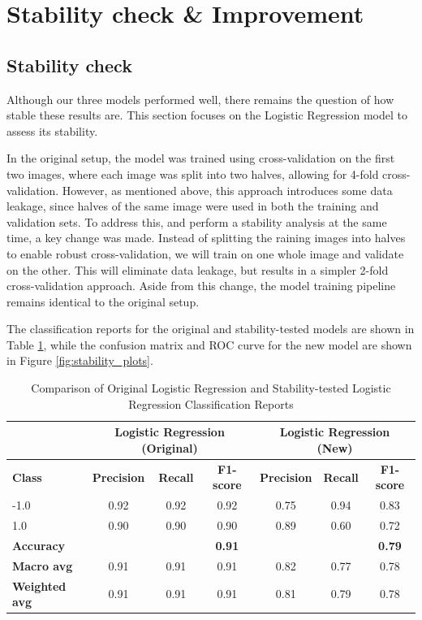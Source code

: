 \documentclass[11pt,letterpaper]{article}
\begin{document}
\newpage
\section{Stability check \& Improvement}

\vspace{1em} %
\subsection{Stability check}
\vspace{0.5em} %
Although our three models performed well, there remains the question of how stable these results are. This section focuses on the Logistic Regression model to assess its stability.

In the original setup, the model was trained using cross-validation on the first two images, where each image was split into two halves, allowing for 4-fold cross-validation. However, as mentioned above, this approach introduces some data leakage, since halves of the same image were used in both the training and validation sets. To address this, and perform a stability analysis at the same time, a key change was made. Instead of splitting the raining images into halves to enable robust cross-validation, we will train on one whole image and validate on the other. This will eliminate data leakage, but results in a simpler 2-fold cross-validation approach. Aside from this change, the model training pipeline remains identical to the original setup.

The classification reports for the original and stability-tested models are shown in Table \ref{tab:model_comparison}, while the confusion matrix and ROC curve for the new model are shown in Figure \ref{fig:stability_plots}. 


\begin{table}[H]
\centering
\begin{tabular}{lccc|ccc}
\hline
\textbf{} & \multicolumn{3}{c|}{\textbf{Logistic Regression (Original)}} & \multicolumn{3}{c}{\textbf{Logistic Regression (New)}} \\
\hline
\textbf{Class} & \textbf{Precision} & \textbf{Recall} & \textbf{F1-score} & \textbf{Precision} & \textbf{Recall} & \textbf{F1-score} \\
\hline
-1.0 & 0.92 & 0.92 & 0.92 & 0.75 & 0.94 & 0.83 \\
1.0 & 0.90 & 0.90 & 0.90 & 0.89 & 0.60 & 0.72 \\
\hline
\textbf{Accuracy} & & & \textbf{0.91} & & & \textbf{0.79} \\
\textbf{Macro avg} & 0.91 & 0.91 & 0.91 & 0.82 & 0.77 & 0.78 \\
\textbf{Weighted avg} & 0.91 & 0.91 & 0.91 & 0.81 & 0.79 & 0.78 \\
\hline
\end{tabular}
\caption{Comparison of Original Logistic Regression and Stability-tested Logistic Regression Classification Reports}
\label{tab:model_comparison}
\end{table}
\end{document}
